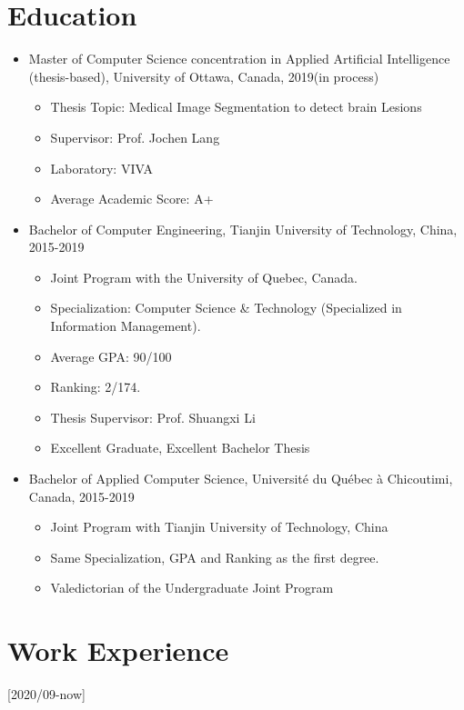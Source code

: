 \documentclass{article}
\begin{document}
\section{Education}

\begin{itemize}
\item Master of Computer Science concentration in Applied Artificial Intelligence (thesis-based), University of Ottawa, Canada, 2019(in process)
\begin{itemize}
    \item Thesis Topic: Medical Image Segmentation to detect brain Lesions
    \item Supervisor: Prof. Jochen Lang
    \item Laboratory: VIVA
    \item Average Academic Score: A+
\end{itemize}
\item Bachelor of Computer Engineering, Tianjin University of Technology, China, 2015-2019
\begin{itemize}
    \item Joint Program with the University of Quebec, Canada.
    \item Specialization: Computer Science \& Technology (Specialized in Information Management).
    \item Average GPA: 90/100
    \item Ranking: 2/174.
    \item Thesis Supervisor: Prof. Shuangxi Li
    \item Excellent Graduate, Excellent Bachelor Thesis
\end{itemize}
\item Bachelor of Applied Computer Science, Université du Québec à Chicoutimi, Canada, 2015-2019
\begin{itemize}
    \item Joint Program with Tianjin University of Technology, China
    \item Same Specialization, GPA and Ranking as the first degree.
    \item Valedictorian of the Undergraduate Joint Program
\end{itemize}
\end{itemize}

\section{Work Experience}

[2020/09-now]
\end{document}
